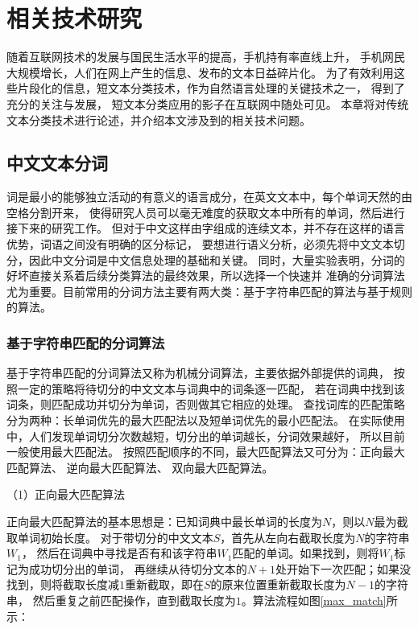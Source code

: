 \chapter{相关技术研究}
随着互联网技术的发展与国民生活水平的提高，手机持有率直线上升，
手机网民大规模增长，人们在网上产生的信息、发布的文本日益碎片化。
为了有效利用这些片段化的信息，短文本分类技术，作为自然语言处理的关键技术之一，
得到了充分的关注与发展，
短文本分类应用的影子在互联网中随处可见。
本章将对传统文本分类技术进行论述，并介绍本文涉及到的相关技术问题。
\iffalse
\section{中文文本分词}
\label{word_seg}
词是最小的能够独立活动的有意义的语言成分，在英文文本中，每个单词天然的由空格分割开来，
使得研究人员可以毫无难度的获取文本中所有的单词，然后进行接下来的研究工作。
但对于中文这样由字组成的连续文本，并不存在这样的语言优势，词语之间没有明确的区分标记，
要想进行语义分析，必须先将中文文本切分，因此中文分词是中文信息处理的基础和关键。
同时，大量实验表明，分词的好坏直接关系着后续分类算法的最终效果，所以选择一个快速并
准确的分词算法尤为重要。目前常用的分词方法主要有两大类：基于字符串匹配的算法与基于规则的算法。
\subsection{基于字符串匹配的分词算法}
基于字符串匹配的分词算法又称为机械分词算法，主要依据外部提供的词典，
按照一定的策略将待切分的中文文本与词典中的词条逐一匹配，
若在词典中找到该词条，则匹配成功并切分为单词，否则做其它相应的处理。
查找词库的匹配策略分为两种：长单词优先的最大匹配法以及短单词优先的最小匹配法。
在实际使用中，人们发现单词切分次数越短，切分出的单词越长，分词效果越好，
所以目前一般使用最大匹配法。
按照匹配顺序的不同，最大匹配算法又可分为：正向最大匹配算法、
逆向最大匹配算法、
双向最大匹配算法。

（1）正向最大匹配算法

正向最大匹配算法的基本思想是：已知词典中最长单词的长度为$N$，则以$N$最为截取单词初始长度。
对于带切分的中文文本$S$，首先从左向右截取长度为$N$的字符串$W_{1}$，
然后在词典中寻找是否有和该字符串$W_{1}$匹配的单词。如果找到，则将$W_{1}$标记为成功切分出的单词，
再继续从待切分文本的$N+1$处开始下一次匹配；如果没找到，则将截取长度减$1$重新截取，即在$S$的原来位置重新截取长度为$N-1$的字符串，
然后重复之前匹配操作，直到截取长度为$1$。算法流程如图\ref{max_match}所示：

